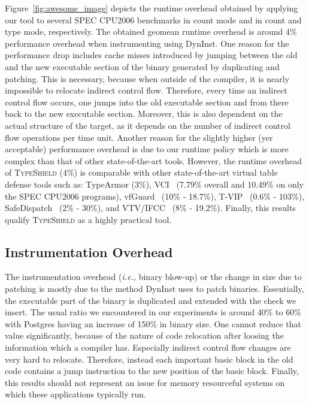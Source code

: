 Figure~\ref{fig:awesome_image} depicts the runtime overhead obtained by applying our tool to several SPEC CPU2006 benchmarks
in count mode and in count and type mode, respectively.
The obtained geomean runtime overhead is around 4\% performance overhead when instrumenting using DynInst. 
One reason for the performance drop includes cache misses introduced by jumping between the old and the new executable section 
of the binary generated by duplicating and patching. This is necessary, because when
outside of the compiler, it is nearly impossible to relocate indirect control flow. Therefore, 
every time an indirect control flow occurs, one jumps into the old executable section and from 
there back to the new executable section. Moreover, this is also dependent on the actual structure 
of the target, as it depends on the number of indirect control flow operations per time unit.
Another reason for the slightly higher (yer acceptable) performance overhead is due to our
runtime policy which is more complex than that of other state-of-the-art tools.
However, the runtime overhead of \textsc{TypeShield} (4\%) is comparable with other state-of-the-art virtual table defense
tools such as: TypeArmor (3\%), VCI~\cite{vci:asiaccs} (7.79\% overall and 10.49\% on only the SPEC CPU2006 programs), vfGuard~\cite{vfuard:aravind} (10\% - 18.7\%), T-VIP~\cite{gawlik} (0.6\% - 103\%), 
SafeDispatch~\cite{safedispatch:jang} (2\% - 30\%), and VTV/IFCC~\cite{vtv:tice} (8\% - 19.2\%).
Finally, this results qualify \textsc{TypeShield} as a highly practical tool.


\subsection{Instrumentation Overhead}
\label{section:typeshieldoverheadinstrumentation}


The instrumentation overhead (\textit{i.e.,} binary blow-up) or the change in size due to patching is mostly due to the method DynInst uses to patch binaries. 
Essentially, the executable part of the binary is duplicated and extended with the check we insert. The usual ratio we encountered in our experiments is 
around 40\% to 60\% with Postgres having an increase of 150\% in binary size. One cannot reduce that 
value significantly, because of the nature of code relocation after loosing the information which a compiler has. Especially indirect control flow 
changes are very hard to relocate. Therefore, instead each important basic block in the old code contains a jump instruction to the new position of the basic block.
Finally, this results should not represent an issue for memory resourceful systems on which these applications typically run.

